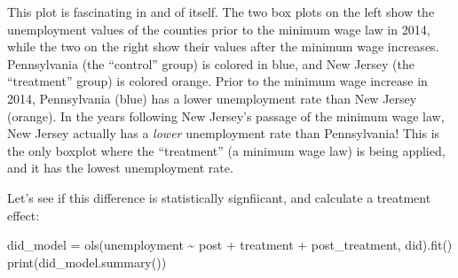 \documentclass[
  letterpaper,
  DIV=11,
  numbers=noendperiod]{scrreprt}
\newenvironment{Shaded}{\begin{snugshade}}{\end{snugshade}}
\newcommand{\BuiltInTok}[1]{\textcolor[rgb]{0.00,0.23,0.31}{#1}}
\newcommand{\NormalTok}[1]{\textcolor[rgb]{0.00,0.23,0.31}{#1}}
\newcommand{\OperatorTok}[1]{\textcolor[rgb]{0.37,0.37,0.37}{#1}}
\newcommand{\StringTok}[1]{\textcolor[rgb]{0.13,0.47,0.30}{#1}}
\begin{document}
This plot is fascinating in and of itself. The two box plots on the left
show the unemployment values of the counties prior to the minimum wage
law in 2014, while the two on the right show their values after the
minimum wage increases. Pennsylvania (the ``control'' group) is colored
in blue, and New Jersey (the ``treatment'' group) is colored orange.
Prior to the minimum wage increase in 2014, Pennsylvania (blue) has a
lower unemployment rate than New Jersey (orange). In the years following
New Jersey's passage of the minimum wage law, New Jersey actually has a
\emph{lower} unemployment rate than Pennsylvania! This is the only
boxplot where the ``treatment'' (a minimum wage law) is being applied,
and it has the lowest unemployment rate.

Let's see if this difference is statistically signfiicant, and calculate
a treatment effect:

\begin{Shaded}
\begin{Highlighting}[]
\NormalTok{did\_model }\OperatorTok{=}\NormalTok{ ols(}\StringTok{\textquotesingle{}unemployment \textasciitilde{}  post + treatment + post\_treatment\textquotesingle{}}\NormalTok{, did).fit()}
\BuiltInTok{print}\NormalTok{(did\_model.summary())}
\end{Highlighting}
\end{Shaded}
\end{document}
